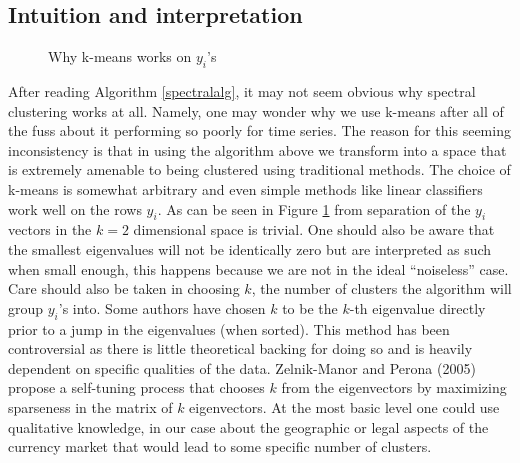 \documentclass[a4paper]{article}
\begin{document}
\begin{multicols}{2}
\subsection{Intuition and interpretation}
\begin{figure}[H]
    \centering
    \quad
    \caption{Why k-means works on $y_i$'s}%
    \label{fig:yrowsex}%
\end{figure}
After reading Algorithm \ref{spectralalg}, it may not seem obvious why spectral clustering works at all. Namely, one may wonder why we use k-means after all of the fuss about it performing so poorly for time series. The reason for this seeming inconsistency is that in using the algorithm above we transform into a space that is extremely amenable to being clustered using traditional methods. The choice of k-means is somewhat arbitrary and even simple methods like linear classifiers work well on the rows $y_i$. As can be seen in Figure \ref{fig:yrowsex} from \cite{ng} separation of the $y_i$ vectors in the $k=2$ dimensional space is trivial. One should also be aware that the smallest eigenvalues will not be identically zero but are interpreted as such when small enough, this happens because we are not in the ideal ``noiseless'' case.
Care should also be taken in choosing $k$, the number of clusters the algorithm will group $y_i$'s into. Some authors have chosen $k$ to be the $k$-th eigenvalue directly prior to a jump in the eigenvalues (when sorted). This method has been controversial as there is little theoretical backing for doing so and is heavily dependent on specific qualities of the data. Zelnik-Manor and Perona (2005) propose a self-tuning process that chooses $k$ from the eigenvectors by maximizing sparseness in the matrix of $k$ eigenvectors. At the most basic level one could use qualitative knowledge, in our case about the geographic or legal aspects of the currency market that would lead to some specific number of clusters.


\end{multicols}
\end{document}
